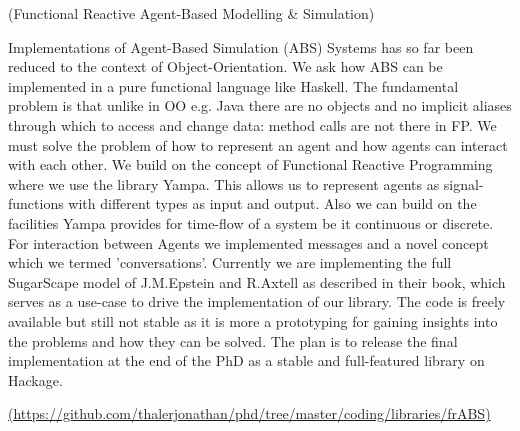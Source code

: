 \documentclass[DIV16,twocolumn,10pt]{scrreprt}
\begin{document}
\begin{hcarentry}{(Functional Reactive Agent-Based Modelling \& Simulation)}
\makeheader

Implementations of Agent-Based Simulation (ABS) Systems has so far been reduced to the context of Object-Orientation. We ask how ABS can be implemented in a pure functional language like Haskell. The fundamental problem is that unlike in OO e.g. Java there are no objects and no implicit aliases through which to access and change data: method calls are not there in FP. We must solve the problem of how to represent an agent and how agents can interact with each other. We build on the concept of Functional Reactive Programming where we use the library Yampa. This allows us to represent agents as signal-functions with different types as input and output. Also we can build on the facilities Yampa provides for time-flow of a system be it continuous or discrete. For interaction between Agents we implemented messages and a novel concept which we termed 'conversations'. Currently we are implementing the full SugarScape model of J.M.Epstein and R.Axtell as described in their book, which serves as a use-case to drive the implementation of our library. The code is freely available but still not stable as it is more a prototyping for gaining insights into the problems and how they can be solved. The plan is to release the final implementation at the end of the PhD as a stable and full-featured library on Hackage.

\FurtherReading
  \url{(https://github.com/thalerjonathan/phd/tree/master/coding/libraries/frABS)}
\end{hcarentry}
\end{document}
